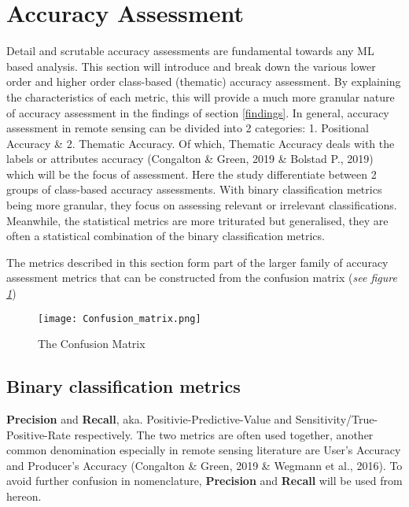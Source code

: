 \documentclass[11pt, a4paper, twoside]{report}
\begin{document}
\section{Accuracy Assessment}\label{AccAss}

Detail and scrutable accuracy assessments are fundamental towards any ML based analysis. This section will introduce and break down the various lower order and higher order class-based (thematic) accuracy assessment. By explaining the characteristics of each metric, this will provide a much more granular nature of accuracy assessment in the findings of section \ref{findings}. In general, accuracy assessment in remote sensing can be divided into 2 categories: 1. Positional Accuracy \& 2. Thematic Accuracy. Of which, Thematic Accuracy deals with the labels or attributes accuracy (Congalton \& Green, 2019 \& Bolstad P., 2019) which will be the focus of assessment. Here the study differentiate between 2 groups of class-based accuracy assessments. With binary classification metrics being more granular, they focus on assessing relevant or irrelevant classifications. Meanwhile, the statistical metrics are more triturated but generalised, they are often a statistical combination of the binary classification metrics.\\\par

The metrics described in this section form part of the larger family of accuracy assessment metrics that can be constructed from the confusion matrix (\textit{see figure \ref{fig:cmatrix}})\\\par

\begin{figure}[H]
  \centering
  \texttt{[image: Confusion\_matrix.png]}
  \caption{The Confusion Matrix}
  \label{fig:cmatrix}
\end{figure}

\subsection{Binary classification metrics}\label{1storder}

\textbf{Precision} and \textbf{Recall}, aka. Positivie-Predictive-Value and Sensitivity/True-Positive-Rate respectively. The two metrics are often used together, another common denomination especially in remote sensing literature are User's Accuracy and Producer's Accuracy (Congalton \& Green, 2019 \& Wegmann et al., 2016). To avoid further confusion in nomenclature, \textbf{Precision} and \textbf{Recall} will be used from hereon.\\\par
\end{document}
